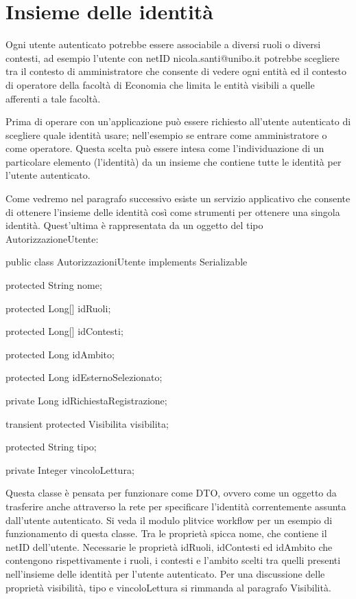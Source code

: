 \section{Insieme delle identità }
Ogni utente autenticato potrebbe essere associabile a diversi ruoli o diversi contesti, ad esempio l'utente con netID nicola.santi@unibo.it potrebbe scegliere tra il contesto di amministratore che consente di vedere ogni entità ed il contesto di operatore della facoltà di Economia che limita le entità visibili a quelle afferenti a tale facoltà. 


Prima di operare con un'applicazione può essere richiesto all'utente autenticato di scegliere quale identità usare; nell'esempio se entrare come amministratore o come operatore. Questa scelta può essere intesa come l'individuazione di un particolare elemento (l'identità) da un insieme che contiene tutte le identità per l'utente autenticato.


Come vedremo nel paragrafo successivo esiste un servizio applicativo che consente di ottenere l'insieme delle identità così come strumenti per ottenere una singola identità. Quest'ultima è rappresentata da un oggetto del tipo AutorizzazioneUtente:

\begin{java}

public class AutorizzazioniUtente implements Serializable {
  
  protected String nome;
  
  protected Long[] idRuoli;

  protected Long[] idContesti;

  protected Long idAmbito;

  protected Long idEsternoSelezionato;
  
  private Long idRichiestaRegistrazione;
  
  transient protected Visibilita visibilita;

  protected String tipo;

  private Integer vincoloLettura;

}

\end{java}


Questa classe è pensata per funzionare come DTO, ovvero come un oggetto da trasferire anche attraverso la rete per specificare l'identità correntemente assunta dall'utente autenticato. Si veda il modulo plitvice workflow per un esempio di funzionamento di questa classe.
Tra le proprietà spicca nome, che contiene il netID dell'utente. Necessarie le proprietà idRuoli, idContesti ed idAmbito che contengono rispettivamente i ruoli, i contesti e l'ambito scelti tra quelli presenti nell'insieme delle identità per l'utente autenticato.
Per una discussione delle proprietà visibilità, tipo e vincoloLettura si rimmanda al paragrafo Visibilità. 

